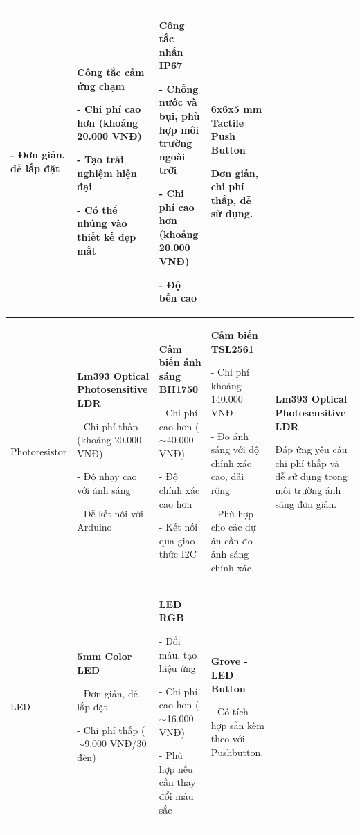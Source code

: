 {{\begin{longtable}{|p{2.3cm}|p{3.2cm}|p{3.2cm}|p{3.2cm}|p{3.5cm}|}
- Đơn giản, dễ lắp đặt & \textbf{Công tắc cảm ứng chạm}


- Chi phí cao hơn (khoảng 20.000 VNĐ)


- Tạo trải nghiệm hiện đại


- Có thể nhúng vào thiết kế đẹp mắt & \textbf{Công tắc nhấn IP67}


- Chống nước và bụi, phù hợp môi trường ngoài trời


- Chi phí cao hơn (khoảng 20.000 VNĐ)


- Độ bền cao 

& \textbf{6x6x5 mm Tactile Push Button}


Đơn giản, chi phí thấp, dễ sử dụng. \\ \hline

Photoresistor 

& \textbf{Lm393 Optical Photosensitive LDR}


- Chi phí thấp (khoảng 20.000 VNĐ)


- Độ nhạy cao với ánh sáng


- Dễ kết nối với Arduino & \textbf{Cảm biến ánh sáng BH1750}


- Chi phí cao hơn ($\sim$40.000 VNĐ)


- Độ chính xác cao hơn


- Kết nối qua giao thức I2C 

& \textbf{Cảm biến TSL2561}


- Chi phí khoảng  140.000 VNĐ


- Đo ánh sáng với độ chính xác cao, dải rộng


- Phù hợp cho các dự án cần đo ánh sáng chính xác 

& \textbf{Lm393 Optical Photosensitive LDR}


Đáp ứng yêu cầu chi phí thấp và dễ sử dụng trong môi trường ánh sáng đơn giản. \\ \hline

LED 

& \textbf{5mm Color LED}


- Đơn giản, dễ lắp đặt


- Chi phí thấp ($\sim$9.000 VNĐ/30 đèn) 

& \textbf{LED RGB}


- Đổi màu, tạo hiệu ứng


- Chi phí cao hơn ($\sim$16.000 VNĐ)


- Phù hợp nếu cần thay đổi màu sắc 

& \textbf{Grove - LED Button}


- Có tích hợp sẵn kèm theo với Pushbutton.



\end{longtable}}}
